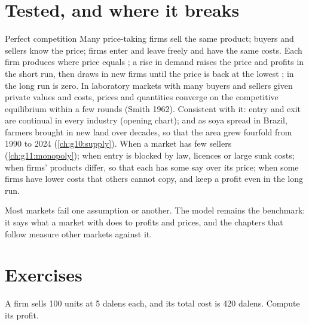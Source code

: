\section{Tested, and where it breaks}\label{sec:g11:perfect-competition:tested}

\begin{model}{Perfect competition}
\assumes Many price-taking firms sell the same product; buyers and sellers know the price; firms enter and leave freely and have the same costs.
\predicts Each firm produces where price equals ; a rise in demand raises the price and profits in the short run, then draws in new firms until the
  price is back at the lowest ; in the long run  is zero.
\tested In laboratory markets with many buyers and sellers given private values and costs, prices and quantities converge on the competitive equilibrium within
  a few rounds (Smith 1962). Consistent with it: entry and exit are continual in every industry (opening chart); and as soya spread in Brazil,
  farmers brought in new land over decades, so that the area grew fourfold from 1990 to 2024 (\cref{ch:g10:supply}).
\breaks When a market has few sellers (\cref{ch:g11:monopoly}); when entry is blocked by law, licences or large sunk costs; when firms' products differ, so
  that each has some say over its price; when some firms have lower costs that others cannot copy, and keep a profit even in the long run.
\end{model}

Most markets fail one assumption or another. The model remains the benchmark: it says what a market with  does to profits and prices, and the
chapters that follow measure other markets against it.

\section{Exercises}

\begin{exercise}[$\star$]\label{exo:g11:perfect-competition:1}
A firm sells 100 units at 5 dalens each, and its total cost is 420 dalens. Compute its profit.
\end{exercise}

